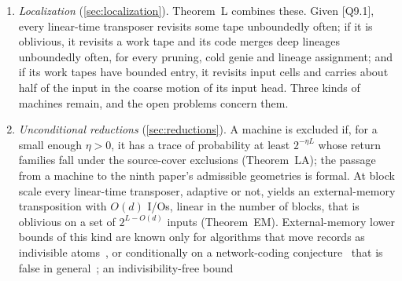 \begin{enumerate}
is robust against padding of bounded entry, as the eighth paper asks: it bounds the entropy of the coarse skeleton at a
fixed scale~$w$, the head positions and the output count rounded down to multiples of~$w$, instead of the entropy of the
trace, and it contains Corollary~F$''$. Its proof turns the machine into a \emph{block machine} that is oblivious on
each skeleton class, so that Theorem~F, the cone lemma and the paired-distance argument of the fifth paper apply class
by class. Heads of bounded entry carry almost no coarse entropy at large scales, and two corollaries follow, given
[Q9.1]. No linear-time transposer, adaptive or not, has bounded entry on every tape, the input tape included
(Corollary~RV). A transposer whose work tapes have bounded entry must therefore revisit input cells unboundedly often,
and its input head must carry about $L/2$ bits of the data in its coarse motion at every fixed scale (Corollary~IS,
which contains Corollary~F$'$ and extends it to adaptive machines). Padding of bounded entry before the run does not
help a machine meet this condition, but padding that revisits input cells unboundedly often meets it at no cost
(\cref{rem:skel-padding}): it is a necessary condition, not an obstruction.
\item \emph{Localization} (\cref{sec:localization}). Theorem~L combines these. Given [Q9.1], every linear-time
transposer revisits some tape unboundedly often; if it is oblivious, it revisits a work tape and its code merges deep
lineages unboundedly often, for every pruning, cold genie and lineage assignment; and if its work tapes have bounded
entry, it revisits input cells and carries about half of the input in the coarse motion of its input head. Three kinds
of machines remain, and the open problems concern them.
\item \emph{Unconditional reductions} (\cref{sec:reductions}). A machine is excluded if, for a small enough $\eta>0$, it
has a trace of probability at least $2^{-\eta L}$ whose return families fall under the source-cover exclusions
(Theorem~LA); the passage from a machine to the ninth paper's admissible geometries is formal. At block scale every
linear-time transposer, adaptive or not, yields an external-memory transposition with $O(d)$ I/Os, linear in the number
of blocks, that is oblivious on a set of $2^{L-O(d)}$ inputs (Theorem~EM). External-memory lower bounds of this kind are
known only for algorithms that move records as indivisible atoms~\cite{AggarwalVitter1988}, or conditionally on a
network-coding conjecture~\cite{FHLS2019} that is false in general~\cite{BravermanHe2026}; an indivisibility-free bound

\end{enumerate}
